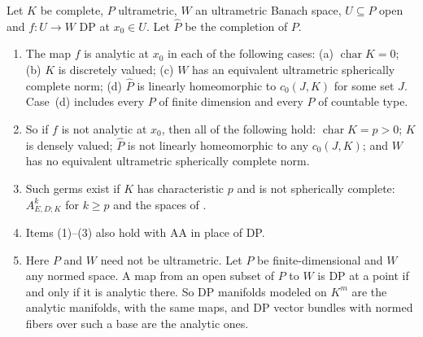 \begin{theorem}\label{dp:thm:conservativity}
Let $K$ be complete, $P$ ultrametric, $W$ an ultrametric Banach space, $U\subseteq P$ open and $f\colon U\to W$ DP at $x_0\in U$. Let $\widehat P$ be the completion of $P$.
\begin{enumerate}
\item The map $f$ is analytic at $x_0$ in each of the following cases: \textup{(a)} $\operatorname{char}K=0$; \textup{(b)} $K$ is discretely valued; \textup{(c)} $W$ has an equivalent ultrametric spherically complete norm; \textup{(d)} $\widehat P$ is linearly homeomorphic to $c_0(J,K)$ for some set $J$. Case~\textup{(d)} includes every $P$ of finite dimension and every $P$ of countable type.
\item So if $f$ is not analytic at $x_0$, then all of the following hold: $\operatorname{char}K=p>0$; $K$ is densely valued; $\widehat P$ is not linearly homeomorphic to any $c_0(J,K)$; and $W$ has no equivalent ultrametric spherically complete norm.
\item Such germs exist if $K$ has characteristic $p$ and is not spherically complete: $A^k_{E,D;K}$ for $k\ge p$ and the spaces of \cite[Theorem~7.2(2)]{I}.
\item Items \textup{(1)}--\textup{(3)} also hold with AA in place of DP.
\item Here $P$ and $W$ need not be ultrametric. Let $P$ be finite-dimensional and $W$ any normed space. A map from an open subset of $P$ to $W$ is DP at a point if and only if it is analytic there. So DP manifolds modeled on $K^m$ are the analytic manifolds, with the same maps, and DP vector bundles with normed fibers over such a base are the analytic ones.
\end{enumerate}
\end{theorem}

